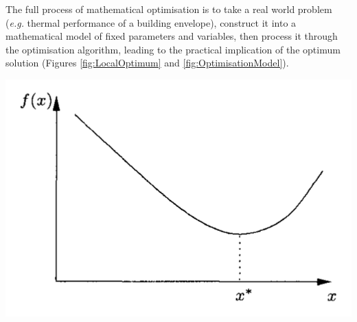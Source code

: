 \documentclass[11pt,a4paper,oneside]{article}
\newenvironment{Figure}		%
	{\par\medskip\noindent\minipage{\linewidth}}
	{\endminipage\par\medskip}
\begin{document}
\begin{multicols}{2}
		The full process of mathematical optimisation is to take a real world problem (\emph{e.g.} thermal performance of a building envelope), construct it into a mathematical model of fixed parameters and variables, then process it through the optimisation algorithm, leading to the practical implication of the optimum solution (Figures \ref{fig:LocalOptimum} and \ref{fig:OptimisationModel}).

\end{multicols}
\begin{Figure}
	\centering
	\includegraphics[width=0.4\linewidth]{./Images/4-LocalOptimum}
	\label{fig:LocalOptimum}
\end{Figure}
\end{document}
